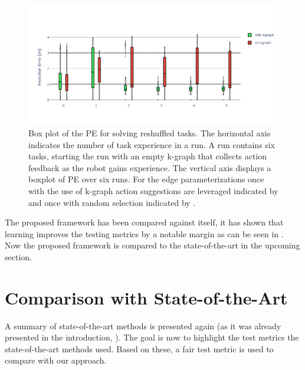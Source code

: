\begin{figure}[H]
    \centering
    \includegraphics[width=\textwidth]{figures/results/random_push_pe_vs}
    \caption{Box plot of the \acl{PE} for solving reshuffled tasks. The horizontal axis indicates the number of task experience in a run. A run contains six tasks, starting the run with an empty \ac{k-graph} that collects action feedback as the robot gains experience. The vertical axis displays a boxplot of \acl{PE} over six runs. For the edge parameterizations once with the use of \ac{k-graph} action suggestions are leveraged indicated by  and once with random selection indicated by .}%
    \label{fig:random_push_pe_vs}
\end{figure}

The proposed framework has been compared against itself, it has shown that learning improves the testing metrics by a notable margin as can be seen in . Now the proposed framework is compared to the state-of-the-art in the upcoming section.\bs


\section{Comparison with State-of-the-Art}%
\label{sec:compare_with_related_papers}
A summary of state-of-the-art methods is presented again (as it was already presented in the introduction, ). The goal is now to highlight the test metrics the state-of-the-art methods used. Based on these, a fair test metric is used to compare with our approach.\bs

